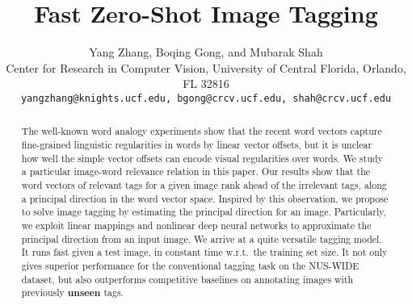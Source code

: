 \documentclass[10pt,twocolumn,letterpaper]{article}
\newcommand{\eat}[1]{{}}
\begin{document}
\title{ Fast Zero-Shot Image Tagging}

\author{Yang Zhang, Boqing Gong, and Mubarak Shah\\ 
Center for Research in Computer Vision, University of Central Florida, Orlando, FL 32816\\
{\tt\small yangzhang@knights.ucf.edu, bgong@crcv.ucf.edu, shah@crcv.ucf.edu}
}

\maketitle


\begin{abstract}


The well-known word analogy experiments show that the recent word vectors capture fine-grained linguistic regularities in words by linear vector offsets, but it is unclear how well the simple vector offsets can encode visual regularities over words. We study a particular image-word relevance relation in this paper. Our results show that the word vectors of   relevant tags for a given image   rank ahead of the irrelevant tags, along a principal direction in the word vector space. Inspired by this observation, we propose to solve image tagging by  estimating the principal direction for an image. Particularly, we exploit linear mappings and nonlinear deep neural networks to approximate the principal direction from an input  image. We arrive at  a quite versatile tagging model. It runs fast given a test image, in constant time w.r.t.\ the training set size. It not only gives superior performance for the conventional tagging task on the NUS-WIDE dataset, but also outperforms  competitive baselines on annotating images with previously {\bf unseen} tags. 


\eat{
Ranking labels that are not seen during training for an image, know as zero-shot tagging, is receiving more and more attention. We have proposed Fast0Tag which is able to rank both seen and unseen labels for query image. Fast0Tag is a neural network transforming each query image to a unique linear ranking hyperplane in embedding space, so that rank hyperplane could ranks labels, regardless they have appeared during training or not, in the embedding space for the query. We have validated presumptions and discussed the optimization of neural network. We have compared Fast0Tag with state-of-art methods as well as some proposed baselines in both conventional and zero-shot labeling task on NUS tagging dataset. Fast0Tag has shown very promising performance improvement compared with baselines.
}
 \end{abstract}
\end{document}
